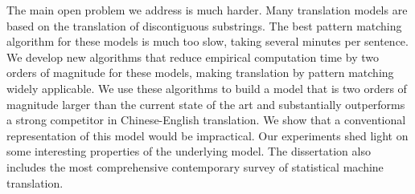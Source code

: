 The main open problem we address is much harder.  Many translation models
are based on the translation of discontiguous substrings.  The best pattern
matching algorithm for these models is much too slow, taking several minutes
per sentence.  We develop new algorithms that reduce empirical computation
time by two orders of magnitude for these models, making translation by
pattern matching widely applicable.  We use these algorithms to build a
model that is two orders of magnitude larger than the current state of the
art and substantially outperforms a strong competitor in Chinese-English
translation.  We show that a conventional representation of this model would
be impractical.  Our experiments shed light on some interesting properties
of the underlying model.  The dissertation also includes the most
comprehensive contemporary survey of statistical machine translation.


